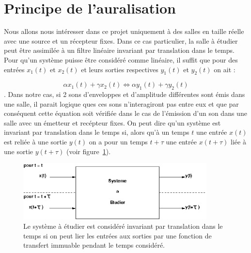 \section{Principe de l'auralisation}

Nous allons nous intéresser dans ce projet uniquement à des salles en taille réelle avec une source et un récepteur
fixes. Dans ce cas particulier, la salle à étudier peut être assimilée à un filtre linéaire invariant par
translation dans le temps. 
Pour qu'un système puisse être considéré comme linéaire, il suffit que pour des entrées $x_1(t)$ et $x_2(t)$ et
leurs sorties respectives $y_1(t)$ et $y_2(t)$ on ait :

\begin{equation}
\alpha x_1(t) + \gamma x_2(t) \Leftrightarrow \alpha y_1(t) + \gamma y_2(t)
\end{equation}.
Dans notre cas, si 2 sons d'enveloppes et d'amplitude différentes sont émis dans une salle, il parait
logique ques ces sons n'interagiront pas entre eux et que par conséquent cette équation soit vérifiée dans
le cas de l'émission d'un son dans une salle avec un émetteur et recépteur fixes.
On peut dire qu'un système est invariant par translation dans le temps si, alors qu'à un temps $t$ une
entrée $x(t)$ est reliée à une sortie $y(t)$ on a pour un temps $t+\tau$ une entrée $x(t+\tau)$ liée à une
sortie $y(t+\tau)$ (voir figure~\ref{systeme_invariant}).

\begin{figure}[h!]
\begin{center}
\includegraphics[width=10cm]{systeme_invariant.png}
\end{center}
\caption{\label{systeme_invariant} Le système à étudier est considéré invariant par translation dans le
temps si on peut lier les entrées aux sorties par une fonction de transfert immuable pendant le temps
considéré.}
\end{figure}


